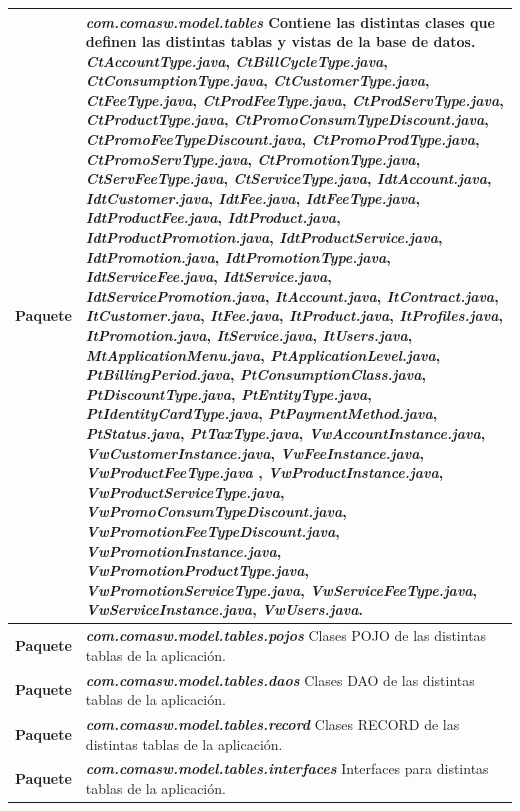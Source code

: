 \begin{longtable}{m{1cm} m{11cm}}
	\textbf{Paquete} & \textit{\textbf{com.comasw.model.tables}} \newline
	Contiene las distintas clases que definen las distintas tablas y vistas de la base de datos.\newline
\textit{CtAccountType.java}, 
\textit{CtBillCycleType.java}, 
\textit{CtConsumptionType.java}, 
\textit{CtCustomerType.java}, 
\textit{CtFeeType.java}, 
\textit{CtProdFeeType.java}, 
\textit{CtProdServType.java}, 
\textit{CtProductType.java}, 
\textit{CtPromoConsumTypeDiscount.java}, 
\textit{CtPromoFeeTypeDiscount.java}, 
\textit{CtPromoProdType.java}, 
\textit{CtPromoServType.java}, 
\textit{CtPromotionType.java}, 
\textit{CtServFeeType.java}, 
\textit{CtServiceType.java}, 
\textit{IdtAccount.java}, 
\textit{IdtCustomer.java}, 
\textit{IdtFee.java}, 
\textit{IdtFeeType.java}, 
\textit{IdtProductFee.java}, 
\textit{IdtProduct.java}, 
\textit{IdtProductPromotion.java}, 
\textit{IdtProductService.java}, 
\textit{IdtPromotion.java}, 
\textit{IdtPromotionType.java}, 
\textit{IdtServiceFee.java}, 
\textit{IdtService.java}, 
\textit{IdtServicePromotion.java}, 
\textit{ItAccount.java}, 
\textit{ItContract.java}, 
\textit{ItCustomer.java}, 
\textit{ItFee.java}, 
\textit{ItProduct.java}, 
\textit{ItProfiles.java}, 
\textit{ItPromotion.java}, 
\textit{ItService.java}, 
\textit{ItUsers.java}, 
\textit{MtApplicationMenu.java}, 
\textit{PtApplicationLevel.java}, 
\textit{PtBillingPeriod.java}, 
\textit{PtConsumptionClass.java}, 
\textit{PtDiscountType.java}, 
\textit{PtEntityType.java}, 
\textit{PtIdentityCardType.java}, 
\textit{PtPaymentMethod.java}, 
\textit{PtStatus.java}, 
\textit{PtTaxType.java}, 
\textit{VwAccountInstance.java}, 
\textit{VwCustomerInstance.java}, 
\textit{VwFeeInstance.java}, 
\textit{VwProductFeeType.java} ,
\textit{VwProductInstance.java}, 
\textit{VwProductServiceType.java}, 
\textit{VwPromoConsumTypeDiscount.java}, 
\textit{VwPromotionFeeTypeDiscount.java}, 
\textit{VwPromotionInstance.java}, 
\textit{VwPromotionProductType.java}, 
\textit{VwPromotionServiceType.java}, 
\textit{VwServiceFeeType.java}, 
\textit{VwServiceInstance.java}, 
\textit{VwUsers.java}.
 \\\hline
	\textbf{Paquete} & \textit{\textbf{com.comasw.model.tables.pojos}}\newline
	Clases POJO de las distintas tablas de la aplicación.
\\\hline
	\textbf{Paquete} & \textit{\textbf{com.comasw.model.tables.daos}}\newline
	Clases DAO de las distintas tablas de la aplicación.
\\\hline
	\textbf{Paquete} & \textit{\textbf{com.comasw.model.tables.record}}\newline
	Clases RECORD de las distintas tablas de la aplicación.
\\\hline
	\textbf{Paquete} & \textit{\textbf{com.comasw.model.tables.interfaces}}\newline
	Interfaces para distintas tablas de la aplicación.
\\\hline

\end{longtable}    